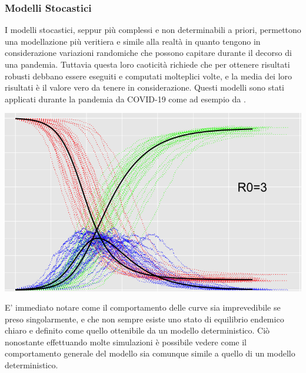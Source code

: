 \subsubsection{Modelli Stocastici}
I modelli stocastici, seppur più complessi e non determinabili 
a priori, permettono una modellazione più veritiera e 
simile alla realtà in quanto tengono in considerazione 
variazioni randomiche che possono capitare durante il 
decorso di una pandemia. Tuttavia questa loro caoticità 
richiede che per ottenere risultati robusti debbano essere 
eseguiti e computati molteplici volte, e la media dei loro 
risultati è il valore vero da tenere in considerazione. 
Questi modelli sono stati applicati durante la pandemia da COVID-19 
come ad esempio da \cite{ijerph17103535}. 

\begin{minipage}{\linewidth}
    \centering
    \includegraphics[width=\textwidth]{img/Gillespie-e1643395123662.png}
    \label{fig:Endemic_equilibrium_stochastic_sir}
\end{minipage}

E' immediato notare come il comportamento delle curve sia 
imprevedibile se preso singolarmente, e che non sempre 
esiste uno stato di equilibrio endemico chiaro e definito come
quello ottenibile da un modello deterministico. Ciò nonostante 
effettuando molte simulazioni è possibile vedere come il 
comportamento generale del modello sia comunque simile a 
quello di un modello deterministico.